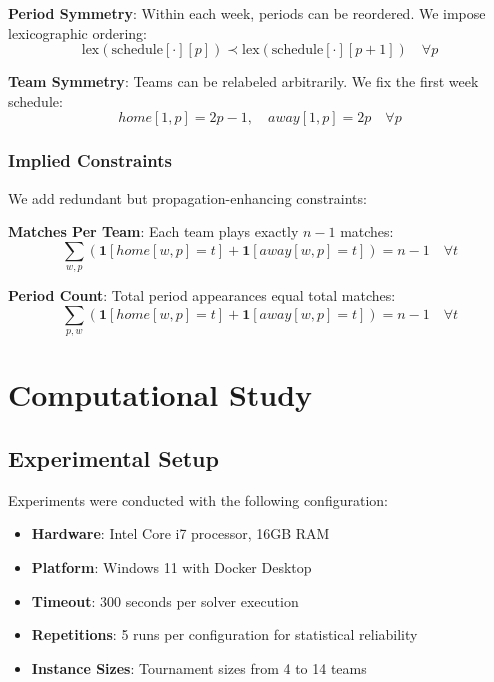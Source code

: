 \documentclass[11pt]{article}
\begin{document}
\begin{itemize}
\textbf{Period Symmetry}: Within each week, periods can be reordered. We impose lexicographic ordering:
\begin{equation}
\text{lex}(\text{schedule}[\cdot][p]) \prec \text{lex}(\text{schedule}[\cdot][p+1]) \quad \forall p
\end{equation}

\textbf{Team Symmetry}: Teams can be relabeled arbitrarily. We fix the first week schedule:
\begin{equation}
home[1,p] = 2p-1, \quad away[1,p] = 2p \quad \forall p
\end{equation}

\subsubsection{Implied Constraints}

We add redundant but propagation-enhancing constraints:

\textbf{Matches Per Team}: Each team plays exactly $n-1$ matches:
\begin{equation}
\sum_{w,p} (\mathbf{1}[home[w,p] = t] + \mathbf{1}[away[w,p] = t]) = n-1 \quad \forall t
\end{equation}

\textbf{Period Count}: Total period appearances equal total matches:
\begin{equation}
\sum_{p,w} (\mathbf{1}[home[w,p] = t] + \mathbf{1}[away[w,p] = t]) = n-1 \quad \forall t
\end{equation}

\section{Computational Study}

\subsection{Experimental Setup}

Experiments were conducted with the following configuration:
\begin{itemize}
    \item \textbf{Hardware}: Intel Core i7 processor, 16GB RAM
    \item \textbf{Platform}: Windows 11 with Docker Desktop
    \item \textbf{Timeout}: 300 seconds per solver execution
    \item \textbf{Repetitions}: 5 runs per configuration for statistical reliability
    \item \textbf{Instance Sizes}: Tournament sizes from 4 to 14 teams
\end{itemize}


\end{itemize}
\end{document}
